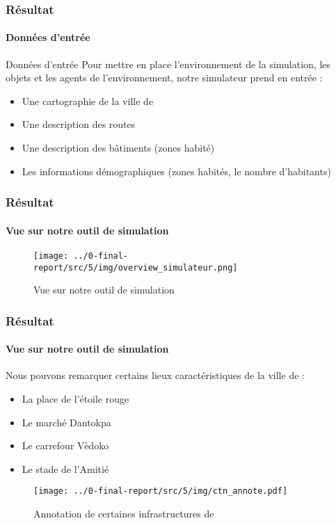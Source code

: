 \begin{frame}
    \frametitle{Résultat}
    \framesubtitle{Données d'entrée}

    \begin{block}{Données d'entrée}
        Pour mettre en place l'environnement de la simulation, les objets et les agents de l'environnement, notre simulateur prend en entrée :
        \begin{itemize}
            \item Une cartographie de la ville de \ctn{}
            \item Une description des routes
            \item Une description des bâtiments (zones habité)
            \item Les informations démographiques (zones habités, le nombre d'habitants)
        \end{itemize}
    \end{block}

\end{frame}

\begin{frame}
    \frametitle{Résultat}
    \framesubtitle{Vue sur notre outil de simulation}

    \begin{figure}[h]
        \centering
        \texttt{[image: ../0-final-report/src/5/img/overview\_simulateur.png]}
        \caption{Vue sur notre outil de simulation}
        \label{fig:simulateur-overview}
    \end{figure}


\end{frame}

\begin{frame}
    \frametitle{Résultat}
    \framesubtitle{Vue sur notre outil de simulation}

    Nous pouvons remarquer certains lieux caractéristiques de la ville de \ctn{}:
    \begin{itemize}
        \item La place de l'étoile rouge
        \item Le marché Dantokpa
        \item Le carrefour Vèdoko
        \item Le stade de l'Amitié
    \end{itemize}
    \begin{figure}[h]
        \centering
        \texttt{[image: ../0-final-report/src/5/img/ctn\_annote.pdf]}
        \caption{Annotation de certaines infrastructures de \ctn{}}
        \label{fig:ctn-anotated}
    \end{figure}

\end{frame}

